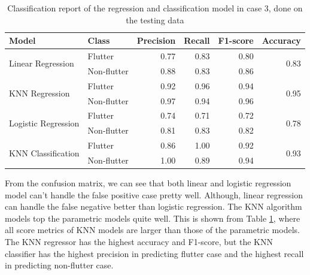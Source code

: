 \documentclass[conf]{new-aiaa}
\begin{document}
\begin{table}[H]
    \centering
    \caption{\label{tab:case3_classification_report}Classification report of the regression and classification model in case 3, done on the testing data}
    \begin{tabular}{llrrrr}
        \toprule
        Model                               & Class         &  Precision    &  Recall       &  F1-score     & Accuracy \\
        \midrule
        \multirow{2}{*}{Linear Regression}  & Flutter       &  0.77         &  0.83         &  0.80         &  \multirow{2}{*}{0.83} \\
                                            & Non-flutter   &  0.88         &  0.83         &  0.86         &   \\
        \midrule
        \multirow{2}{*}{KNN Regression}     & Flutter       &  0.92         &  0.96         &  0.94         &  \multirow{2}{*}{0.95} \\
                                            & Non-flutter   &  0.97         &  0.94         &  0.96         &   \\
        \midrule
        \multirow{2}{*}{Logistic Regression} & Flutter       &  0.74         &  0.71         &  0.72         &  \multirow{2}{*}{0.78} \\
                                            & Non-flutter   &  0.81         &  0.83         &  0.82         &   \\
        \midrule
        \multirow{2}{*}{KNN Classification} & Flutter       &  0.86         &  1.00         &  0.92         &  \multirow{2}{*}{0.93} \\
                                            & Non-flutter   &  1.00         &  0.89         &  0.94         &   \\
        \bottomrule
    \end{tabular}
\end{table}

From the confusion matrix, we can see that both linear and logistic regression model can't handle the false positive case pretty well. Although, linear regression can handle the false negative better than logistic regression. The KNN algorithm models top the parametric models quite well. This is shown from Table \ref{tab:case3_classification_report}, where all score metrics of KNN models are larger than those of the parametric models. The KNN regressor has the highest accuracy and F1-score, but the KNN classifier has the highest precision in predicting flutter case and the highest recall in predicting non-flutter case.
\end{document}
